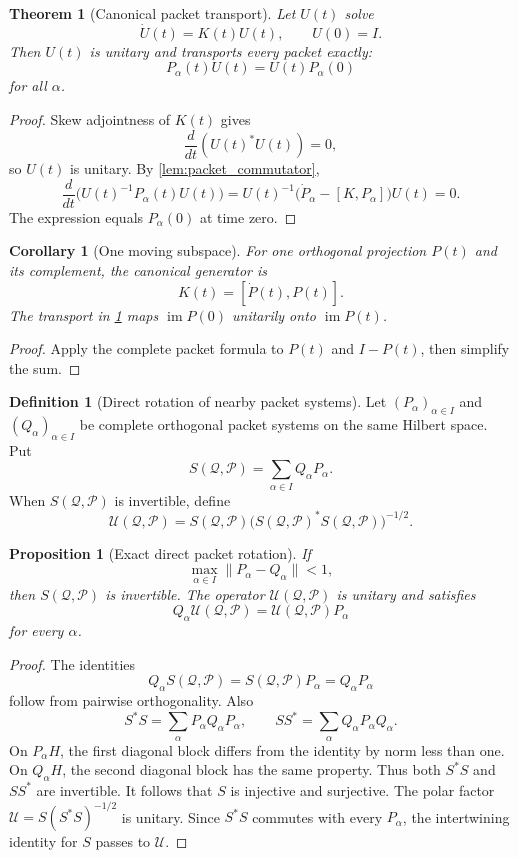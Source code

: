 \documentclass{aomart}
\newtheorem{theorem}{Theorem}[section]
\newtheorem{proposition}[proposition]{Proposition}
\newtheorem{corollary}[corollary]{Corollary}
\theoremstyle{definition}
\newtheorem{definition}[definition]{Definition}
\theoremstyle{remark}
\newcommand{\Pcal}{\mathcal P}
\newcommand{\Qcal}{\mathcal Q}
\newcommand{\Ucal}{\mathcal U}
\newcommand{\im}{\operatorname{im}}
\begin{document}
\begin{theorem}[Canonical packet transport]\label{thm:kato_transport}
Let $U(t)$ solve
\[
\dot U(t)=K(t)U(t),
\qquad
U(0)=I.
\]
Then $U(t)$ is unitary and transports every packet exactly:
\[
P_\alpha(t)U(t)=U(t)P_\alpha(0)
\]
for all $\alpha$.
\end{theorem}

\begin{proof}
Skew adjointness of $K(t)$ gives
\[
\frac{d}{dt}(U(t)^*U(t))=0,
\]
so $U(t)$ is unitary.  By \cref{lem:packet_commutator},
\[
\frac{d}{dt}\big(U(t)^{-1}P_\alpha(t)U(t)\big)
=
U(t)^{-1}\big(\dot P_\alpha-[K,P_\alpha]\big)U(t)
=0.
\]
The expression equals $P_\alpha(0)$ at time zero.
\end{proof}

\begin{corollary}[One moving subspace]\label{cor:one_moving_subspace}
For one orthogonal projection $P(t)$ and its complement, the canonical generator is
\[
K(t)=[\dot P(t),P(t)].
\]
The transport in \cref{thm:kato_transport} maps $\im P(0)$ unitarily onto $\im P(t)$.
\end{corollary}

\begin{proof}
Apply the complete packet formula to $P(t)$ and $I-P(t)$, then simplify the sum.
\end{proof}


\begin{definition}[Direct rotation of nearby packet systems]\label{def:packet_direct_rotation}
Let $(P_\alpha)_{\alpha\in I}$ and $(Q_\alpha)_{\alpha\in I}$ be complete orthogonal packet systems on the same Hilbert space.  Put
\[
S(\Qcal,\Pcal)=\sum_{\alpha\in I}Q_\alpha P_\alpha.
\]
When $S(\Qcal,\Pcal)$ is invertible, define
\[
\Ucal(\Qcal,\Pcal)
=
S(\Qcal,\Pcal)
\big(S(\Qcal,\Pcal)^*S(\Qcal,\Pcal)\big)^{-1/2}.
\]
\end{definition}

\begin{proposition}[Exact direct packet rotation]\label{prop:packet_direct_rotation}
If
\[
\max_{\alpha\in I}\|P_\alpha-Q_\alpha\|<1,
\]
then $S(\Qcal,\Pcal)$ is invertible.  The operator $\Ucal(\Qcal,\Pcal)$ is unitary and satisfies
\[
Q_\alpha\Ucal(\Qcal,\Pcal)
=
\Ucal(\Qcal,\Pcal)P_\alpha
\]
for every $\alpha$.
\end{proposition}

\begin{proof}
The identities
\[
Q_\alpha S(\Qcal,\Pcal)
=
S(\Qcal,\Pcal)P_\alpha
=
Q_\alpha P_\alpha
\]
follow from pairwise orthogonality.  Also
\[
S^*S
=
\sum_\alpha P_\alpha Q_\alpha P_\alpha,
\qquad
SS^*
=
\sum_\alpha Q_\alpha P_\alpha Q_\alpha.
\]
On $P_\alpha H$, the first diagonal block differs from the identity by norm less than one.  On $Q_\alpha H$, the second diagonal block has the same property.  Thus both $S^*S$ and $SS^*$ are invertible.  It follows that $S$ is injective and surjective.  The polar factor $\Ucal=S(S^*S)^{-1/2}$ is unitary.  Since $S^*S$ commutes with every $P_\alpha$, the intertwining identity for $S$ passes to $\Ucal$.
\end{proof}
\end{document}

